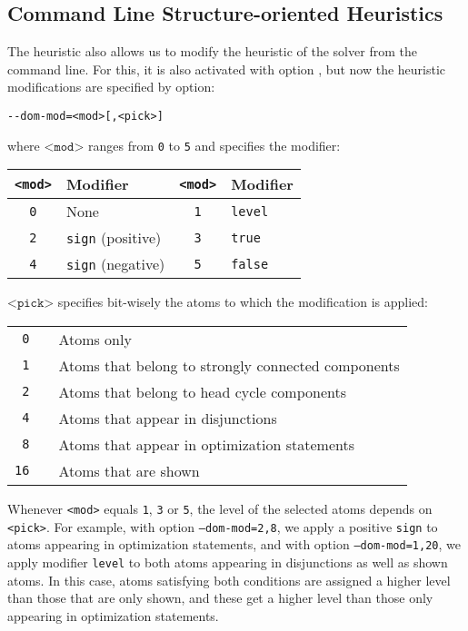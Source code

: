 \subsection{Command Line Structure-oriented Heuristics}

The  heuristic also allows us to modify the heuristic of the solver from the command line.
For this, it is also activated with option , 
but now the heuristic modifications are specified by option:
\begin{center}\lstinline{--dom-mod=<mod>[,<pick>]}\end{center}
where $\texttt{<mod>}$ ranges from \texttt{0} to \texttt{5} and specifies the modifier:
\begin{center}
\begin{tabular}{cl|cl}
\texttt{<mod>} & Modifier                    & \texttt{<mod>} & Modifier     \\
\hline
\texttt{0}     & None                        & \texttt{1}     & \texttt{level}\\
\texttt{2}     & \texttt{sign} (positive)    & \texttt{3}     & \texttt{true} \\
\texttt{4}     & \texttt{sign} (negative)    & \texttt{5}     & \texttt{false}
\end{tabular}
\end{center}
$\texttt{<pick>}$ specifies bit-wisely the atoms to which the modification is applied:
\begin{center}
\begin{tabular}{rcl}
\texttt{0}  & & Atoms only\\
\texttt{1}  & & Atoms that belong to strongly connected components \\
\texttt{2}  & & Atoms that belong to head cycle components \\ %
\texttt{4}  & & Atoms that appear in disjunctions\\
\texttt{8}  & & Atoms that appear in optimization statements\\
\texttt{16} & & Atoms that are shown
\end{tabular}
\end{center}
Whenever \texttt{<mod>} equals \texttt{1}, \texttt{3} or \texttt{5},
the level of the selected atoms depends on \texttt{<pick>}.
For example, with option \texttt{--dom-mod=2,8},
we apply a positive \texttt{sign} to atoms appearing in optimization statements,
and with option \texttt{--dom-mod=1,20},
we apply modifier \texttt{level} to both atoms appearing in disjunctions as well as shown atoms.
In this case, atoms satisfying both conditions
are assigned a higher level than those that are only shown,
and these get a higher level than those only appearing in optimization statements.

